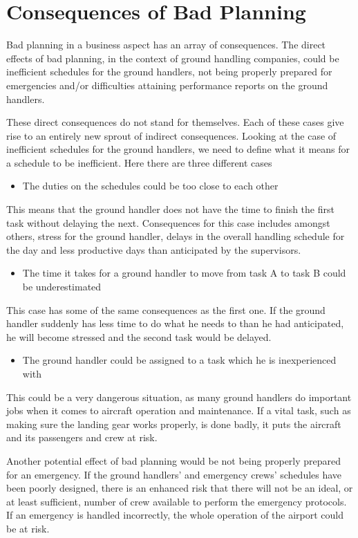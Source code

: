 \section{Consequences of Bad Planning}
Bad planning in a business aspect has an array of consequences. The direct effects of bad planning, in the context of ground handling companies, could be inefficient schedules for the ground handlers, not being properly prepared for emergencies and/or difficulties attaining performance reports on the ground handlers.

These direct consequences do not stand for themselves. Each of these cases give rise to an entirely new sprout of indirect consequences.
Looking at the case of inefficient schedules for the ground handlers, we need to define what it means for a schedule to be inefficient. Here there are three different cases
\begin{itemize}
	\item The duties on the schedules could be too close to each other
\end{itemize}
This means that the ground handler does not have the time to finish the first task without delaying the next. Consequences for this case includes amongst others, stress for the ground handler, delays in the overall handling schedule for the day and less productive days than anticipated by the supervisors.
\begin{itemize}
	\item The time it takes for a ground handler to move from task A to task B could be underestimated
\end{itemize}
This case has some of the same consequences as the first one. If the ground handler suddenly has less time to do what he needs to than he had anticipated, he will become stressed and the second task would be delayed.
\begin{itemize}
	\item The ground handler could be assigned to a task which he is inexperienced with
\end{itemize}
This could be a very dangerous situation, as many ground handlers do important jobs when it comes to aircraft operation and maintenance. If a vital task, such as making sure the landing gear works properly, is done badly, it puts the aircraft and its passengers and crew at risk.


Another potential effect of bad planning would be not being properly prepared for an emergency. If the ground handlers' and emergency crews' schedules have been poorly designed, there is an enhanced risk that there will not be an ideal, or at least sufficient, number of crew available to perform the emergency protocols. If an emergency is handled incorrectly, the whole operation of the airport could be at risk.


